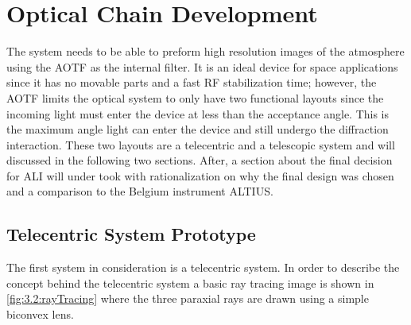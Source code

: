 \section{Optical Chain Development}

The system needs to be able to preform high resolution images of the atmosphere using the AOTF as the internal filter. It is an ideal device for space applications since it has no movable parts and a fast RF stabilization time; however, the AOTF limits the optical system to only have two functional layouts since the incoming light must enter the device at less than the acceptance angle. This is the maximum angle light can enter the device and still undergo the diffraction interaction. These two layouts are a telecentric and a telescopic system and will discussed in the following two sections. After, a section about the final decision for ALI will under took with rationalization on why the final design was chosen and a comparison to the Belgium instrument ALTIUS.


\subsection{Telecentric System Prototype}
\label{sec:3.2:telecentricSystem}

The first system in consideration is a telecentric system. In order to describe the concept behind the telecentric system a basic ray tracing image is shown in \autoref{fig:3.2:rayTracing} where the three paraxial rays are drawn using a simple biconvex lens. %

